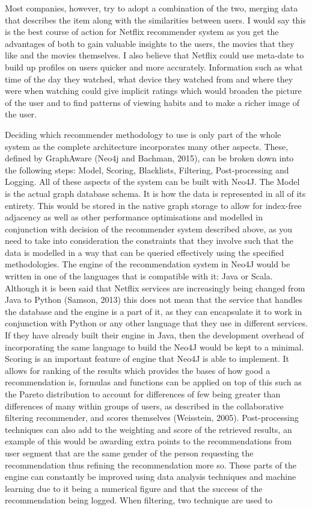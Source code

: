\documentclass[a4paper]{article}
\begin{document}
Most companies, however, try to adopt a combination of the two, merging data that describes the item along with the similarities between users. I would say this is the best course of action for Netflix recommender system as you get the advantages of both to gain valuable insights to the users, the movies that they like and the movies themselves. I also believe that Netflix could use meta-date to build up profiles on users quicker and more accurately. Information such as what time of the day they watched, what device they watched from and where they were when watching could give implicit ratings which would broaden the picture of the user and to find patterns of viewing habits and to make a richer image of the user. \par

Deciding which recommender methodology to use is only part of the whole system as the complete architecture incorporates many other aspects. These, defined by GraphAware (Neo4j and Bachman, 2015), can be broken down into the following steps: Model, Scoring, Blacklists, Filtering, Post-processing and Logging. All of these aspects of the system can be built with Neo4J. The Model is the actual graph database schema. It is how the data is represented in all of its entirety. This would be stored in the native graph storage to allow for index-free adjacency as well as other performance optimisations and modelled in conjunction with decision of the recommender system described above, as you need to take into consideration the constraints that they involve such that the data is modelled in a way that can be queried effectively using the specified methodologies. The engine of the recommendation system in Neo4J would be written in one of the languages that is compatible with it: Java or Scala. Although it is been said that Netflix services are increasingly being changed from Java to Python (Samson, 2013) this does not mean that the service that handles the database and the engine is a part of it, as they can encapsulate it to work in conjunction with Python or any other language that they use in different services. If they have already built their engine in Java, then the development overhead of incorporating the same language to build the Neo4J would be kept to a minimal. Scoring is an important feature of engine that Neo4J is able to implement. It allows for ranking of the results which provides the bases of how good a recommendation is, formulas and functions can be applied on top of this such as the Pareto distribution to account for differences of few being greater than differences of many within groups of users, as described in the collaborative filtering recommender, and scores themselves (Weisstein, 2005). Post-processing techniques can also add to the weighting and score of the retrieved results, an example of this would be awarding extra points to the recommendations from user segment that are the same gender of the person requesting the recommendation thus refining the recommendation more so. These parts of the engine can constantly be improved using data analysis techniques and machine learning due to it being a numerical figure and that the success of the recommendation being logged. When filtering, two technique are used to 
\end{document}
